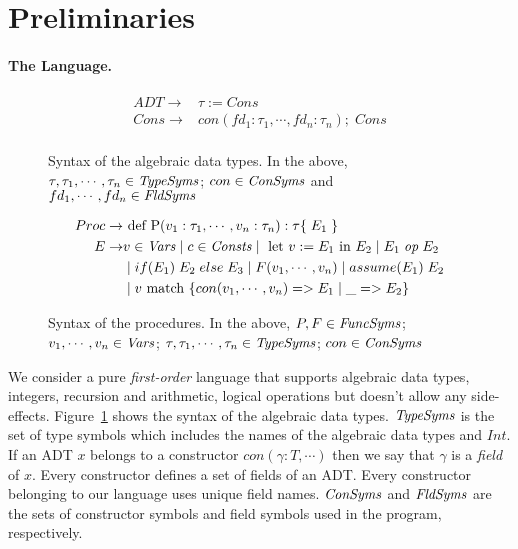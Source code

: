 \section{Preliminaries}

\paragraph{The Language.}

\begin{figure}
\begin{align*}
ADT \rightarrow  & \tau := Cons \\
Cons \rightarrow & con(fd_1 : \tau_1,\cdots,fd_n : \tau_n); \; Cons \\
\end{align*}
\caption{Syntax of the algebraic data types. In the above, $\tau,\tau_1, \cdots, \tau_n \in \mathit{TypeSyms}$;
$con \in \mathit{ConSyms}$ and $fd_1,\cdots,fd_n \in \mathit{FldSyms}$ } \label{fig:type-syntax}
\end{figure}
%
\begin{figure}
\begin{align*}
Proc \rightarrow & \text{ def P}(v_1 : \tau_1,\cdots,v_n : \tau_n) : \tau \{ \; E_1 \; \}  \\
E \rightarrow &  v \in \mathit{Vars} \; | \; c \in \mathit{Consts} \; | \; \text{ let } v := E_1 \text{ in } E_2 \; | \; E_1 \; \mathit{op} \; E_2 \\
				 & \; | \; if(E_1) \; E_2 \; else \; E_3 \; | \; F(v_1,\cdots,v_n) \; | \; assume(E_1) \; E_2 \\
				 & \; | \; v \text{ match } \{ con(v_1,\cdots,v_n) => E_1 \; | \; \_ => E_2 \} \\ 
\end{align*}
\caption{Syntax of the procedures. In the above, $P,F \in \mathit{FuncSyms}$; 
$v_1,\cdots,v_n \in \mathit{Vars}$; $\tau,\tau_1,\cdots,\tau_n \in \mathit{TypeSyms}$; $con \in \mathit{ConSyms}$} \label{fig:lang-syntax}
\end{figure}
%
We consider a pure \emph{first-order} language that supports algebraic data types,
integers, recursion and arithmetic, logical operations but doesn't allow any side-effects.
Figure~\ref{fig:type-syntax} shows the syntax of the algebraic data types.
$\mathit{TypeSyms}$ is the set of type symbols which includes the names of the algebraic data 
types and $Int$.
If an ADT $x$ belongs to a constructor $con(\gamma: T,\cdots)$ then we say that 
$\gamma$ is a \emph{field} of $x$. Every constructor defines a set of fields of an ADT. 
Every constructor belonging to our language uses unique field names.  
$\mathit{ConSyms}$ and $\mathit{FldSyms}$ are the sets of constructor symbols and field symbols 
used in the program, respectively.

